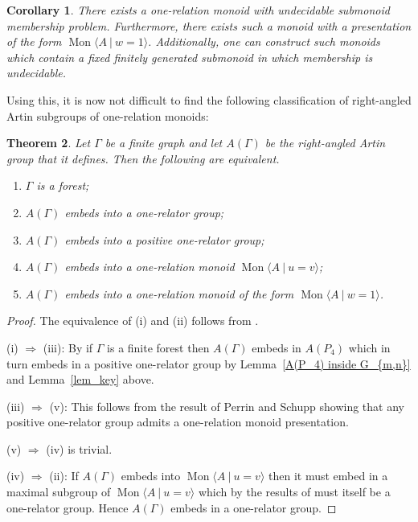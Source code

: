 \documentclass{amsart}
\newcommand{\Mpres}[2]{\operatorname{Mon}\bigl\langle #1\:|\:#2 \bigr\rangle}
\theoremstyle{plain}
\newtheorem{theorem}{Theorem}[section]
\newtheorem{cor}[theorem]{Corollary}
\theoremstyle{definition}
\begin{document}
\begin{cor}\label{Cor:Exist-special-undecidable}
There exists a one-relation monoid with undecidable submonoid membership problem. Furthermore, there exists such a monoid with a presentation of the form $\Mpres{A}{w=1}$. Additionally, one can construct such monoids which contain a fixed finitely generated submonoid in which membership is undecidable.  
\end{cor}

Using this, it is now not difficult to find the following classification of right-angled Artin subgroups of one-relation monoids:

\begin{theorem}\label{thm_RAAGsEmbedding} 
Let $\Gamma$ be a finite graph and let $A(\Gamma)$ be the right-angled Artin group that it defines. Then the following are equivalent. 
\begin{enumerate} 
\item[(i)] $\Gamma$ is a forest; 
\item[(ii)] $A(\Gamma)$ embeds into a one-relator group;  
\item[(iii)] $A(\Gamma)$ embeds into a positive one-relator group;  
\item[(iv)] $A(\Gamma)$ embeds into a one-relation monoid $\Mpres{A}{u=v}$;   
\item[(v)] $A(\Gamma)$ embeds into a one-relation monoid of the form $\Mpres{A}{w=1}$.   
  \end{enumerate} 
  \end{theorem}
\begin{proof} 
The equivalence of (i) and (ii) follows from \cite[Remark 2.3]{gray2020undecidability}.

(i) $\Rightarrow$ (iii): 
By \cite[Theorem 1.8]{Kim2013} if $\Gamma$ is a finite forest then $A(\Gamma)$ embeds in $A(P_4)$ which in turn embeds in a positive one-relator group by Lemma~\ref{A(P_4) inside G_{m,n}} and Lemma~\ref{lem_key} above. 

(iii) $\Rightarrow$ (v): 
This follows from the result of Perrin and Schupp \cite{Perrin1984} showing that any positive one-relator group admits a one-relation monoid presentation. 

(v) $\Rightarrow$ (iv) is trivial. 

(iv) $\Rightarrow$ (ii): 
If $A(\Gamma)$ embeds into $\Mpres{A}{u=v}$ then it must embed in a maximal subgroup of $\Mpres{A}{u=v}$ which by the results of \cite{Lallement1974} must itself be a one-relator group. Hence $A(\Gamma)$ embeds in a one-relator group.   
  \end{proof}
\end{document}
